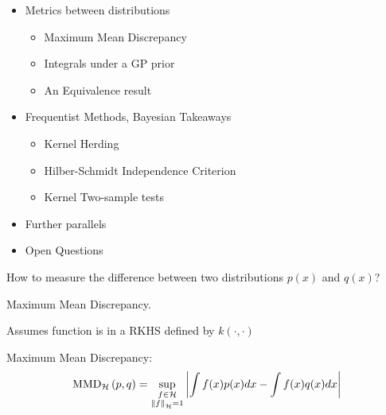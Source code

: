 \documentclass[usenames,dvipsnames]{beamer}
\begin{document}
\begin{frame}[plain, t]
	\bodyheaderskip
	\slidebody
	{
		\begin{itemize}
			\item Metrics between distributions
			\begin{itemize}
				\item Maximum Mean Discrepancy
				\item Integrals	under a GP prior
				\item An Equivalence result
			\end{itemize}
			\item Frequentist Methods, Bayesian Takeaways
			\begin{itemize}
				\item Kernel Herding
				\item Hilber-Schmidt Independence Criterion
				\item Kernel Two-sample tests
			\end{itemize}			
			\item Further parallels
			\item Open Questions
		\end{itemize}
	}
\end{frame}



\begin{frame}[plain, t]
	\titlebodyskip
	

	\slidebody
	{
		How to measure the difference between two distributions $p(x)$ and $q(x)$?
		
		Maximum Mean Discrepancy.
		
		Assumes function is in a RKHS defined by $k(\cdot , \cdot)$		
		
		Maximum Mean Discrepancy:
		\begin{align*}
			{\rm MMD}_{\mathcal{H}}\left(p,q\right) = \sup_{\substack{f\in\mathcal{H}\\\left\|f\right\|_{\mathcal{H}}=1}}\left\vert\int f(x) p(x) dx - \int f(x) q(x) dx \right\vert
		\end{align*}
	}
\end{frame}
\end{document}
